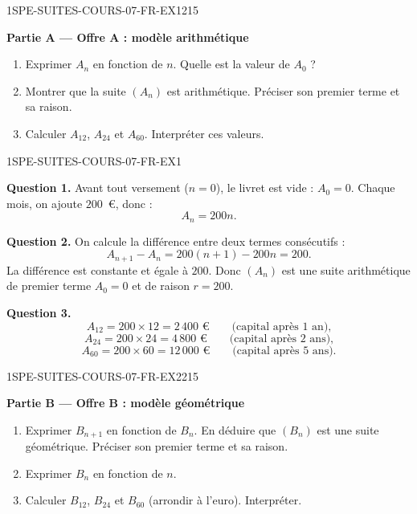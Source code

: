 \begin{exercice}{1SPE-SUITES-COURS-07-FR-EX1}{2}{15}

\textbf{Partie A — Offre A : modèle arithmétique}

\begin{enumerate}
  \item Exprimer $A_n$ en fonction de $n$. Quelle est la valeur de $A_0$ ?
  \item Montrer que la suite $(A_n)$ est arithmétique. Préciser son premier terme et sa raison.
  \item Calculer $A_{12}$, $A_{24}$ et $A_{60}$. Interpréter ces valeurs.
\end{enumerate}

\end{exercice}

\begin{corrige}{1SPE-SUITES-COURS-07-FR-EX1}


\textbf{Question 1.} Avant tout versement ($n = 0$), le livret est vide : $A_0 = 0$. Chaque mois, on ajoute $200$~€, donc :
\[
  A_n = 200n.
\]

\textbf{Question 2.} On calcule la différence entre deux termes consécutifs :
\[
  A_{n+1} - A_n = 200(n+1) - 200n = 200.
\]
La différence est constante et égale à $200$. Donc $(A_n)$ est une suite arithmétique de premier terme $A_0 = 0$ et de raison $r = 200$.

\textbf{Question 3.}
\[
  A_{12} = 200 \times 12 = 2\,400 \text{ €} \qquad \text{(capital après 1 an),}
\]
\[
  A_{24} = 200 \times 24 = 4\,800 \text{ €} \qquad \text{(capital après 2 ans),}
\]
\[
  A_{60} = 200 \times 60 = 12\,000 \text{ €} \qquad \text{(capital après 5 ans).}
\]

\end{corrige}

\bigskip


\begin{exercice}{1SPE-SUITES-COURS-07-FR-EX2}{2}{15}

\textbf{Partie B — Offre B : modèle géométrique}

\begin{enumerate}
  \item Exprimer $B_{n+1}$ en fonction de $B_n$. En déduire que $(B_n)$ est une suite géométrique. Préciser son premier terme et sa raison.
  \item Exprimer $B_n$ en fonction de $n$.
  \item Calculer $B_{12}$, $B_{24}$ et $B_{60}$ (arrondir à l'euro). Interpréter.
\end{enumerate}

\end{exercice}

